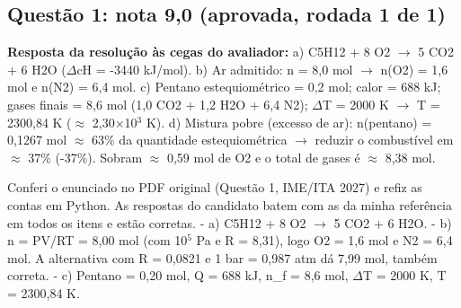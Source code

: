 \documentclass{article}%
\begin{document}
\subsection*{Questão 1: nota 9,0 (aprovada, rodada 1 de 1)}%
\textbf{Resposta da resolução às cegas do avaliador:} a) C5H12 + 8 O2 $\to$ 5 CO2 + 6 H2O ($\Delta$cH = -3440 kJ/mol).\newline%
b) Ar admitido: n = 8,0 mol $\to$ n(O2) = 1,6 mol e n(N2) = 6,4 mol.\newline%
c) Pentano estequiométrico = 0,2 mol; calor = 688 kJ; gases finais = 8,6 mol (1,0 CO2 + 1,2 H2O + 6,4 N2); $\Delta$T = 2000 K $\to$ T = 2300,84 K ($\approx$ 2,30$\times$10$^3$ K).\newline%
d) Mistura pobre (excesso de ar): n(pentano) = 0,1267 mol $\approx$ 63\% da quantidade estequiométrica $\to$ reduzir o combustível em $\approx$ 37\% (-37\%). Sobram $\approx$ 0,59 mol de O2 e o total de gases é $\approx$ 8,38 mol.\par %
Conferi o enunciado no PDF original (Questão 1, IME/ITA 2027) e refiz as contas em Python. As respostas do candidato batem com as da minha referência em todos os itens e estão corretas.\newline%
{-} a) C5H12 + 8 O2 $\to$ 5 CO2 + 6 H2O.\newline%
{-} b) n = PV/RT = 8,00 mol (com 10$^{5}$ Pa e R = 8,31), logo O2 = 1,6 mol e N2 = 6,4 mol. A alternativa com R = 0,0821 e 1 bar = 0,987 atm dá 7,99 mol, também correta.\newline%
{-} c) Pentano = 0,20 mol, Q = 688 kJ, n\_f = 8,6 mol, $\Delta$T = 2000 K, T = 2300,84 K.\newline%
\end{document}
